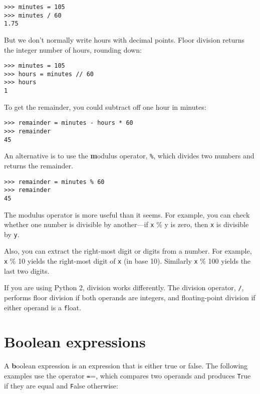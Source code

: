\documentclass[
DIV=11,
fontsize=12,
twoside,
headinclude=false,
titlepage=firstiscover,
abstract=true,
headsepline=true,
footsepline=true,
chapterprefix=true, %
headings=big,
bibliography=totoc,%
captions=tableheading
]{scrbook}
\theoremstyle{definition}
\begin{document}
\begin{lstlisting}
>>> minutes = 105
>>> minutes / 60
1.75
\end{lstlisting}

But we don't normally write hours with decimal points.  Floor
division returns the integer number of hours, rounding down:

\begin{lstlisting}
>>> minutes = 105
>>> hours = minutes // 60
>>> hours
1
\end{lstlisting}

To get the remainder, you could subtract off one hour in minutes:

\begin{lstlisting}
>>> remainder = minutes - hours * 60
>>> remainder
45
\end{lstlisting}


An alternative is to use the {\textbf modulus operator}, \verb"%", which
divides two numbers and returns the remainder.

\begin{lstlisting}
>>> remainder = minutes % 60
>>> remainder
45
\end{lstlisting}
%
The modulus operator is more useful than it seems.  For
example, you can check whether one number is divisible by another---if
{\texttt x \% y} is zero, then {\texttt x} is divisible by {\texttt y}.

Also, you can extract the right-most digit
or digits from a number.  For example, {\texttt x \% 10} yields the
right-most digit of {\texttt x} (in base 10).  Similarly {\texttt x \% 100}
yields the last two digits.

If you are using Python 2, division works differently.  The
division operator, \verb"/", performs floor division if both
operands are integers, and floating-point division if either
operand is a {\texttt float}.


\section{Boolean expressions}

A {\textbf boolean expression} is an expression that is either true
or false.  The following examples use the 
operator {\texttt ==}, which compares two operands and produces
{\texttt True} if they are equal and {\texttt False} otherwise:
\end{document}
